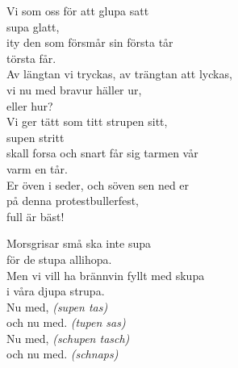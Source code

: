 \documentclass[a6paper, 10pt, twoside]{article}
\begin{document}
\newpage
\noindent
\begin{center}
\end{center}
\begin{lyrics}
Vi som oss för att glupa satt \\
supa glatt, \\
ity den som försmår sin första tår \\
törsta får. \\
Av längtan vi tryckas, av trängtan att lyckas, \\
vi nu med bravur häller ur, \\
eller hur? 
\vspace{5pt} \\
Vi ger tätt som titt strupen sitt, \\
supen stritt \\
skall forsa och snart får sig tarmen vår \\
varm en tår. \\
Er öven i seder, och söven sen ned er\\ 
på denna protestbullerfest, \\
full är bäst! 
\end{lyrics}
\begin{center}
\end{center}
\begin{lyrics}
Morsgrisar små ska inte supa \\
för de stupa allihopa. \\
Men vi vill ha brännvin fyllt med skupa \\
i våra djupa strupa. 
\vspace{5pt} \\
Nu med, \textit{(supen tas) }\\
och nu med. \textit{(tupen sas) }\\
Nu med, \textit{(schupen tasch) }\\
och nu med. \textit{(schnaps) }
\end{lyrics}
\end{document}
